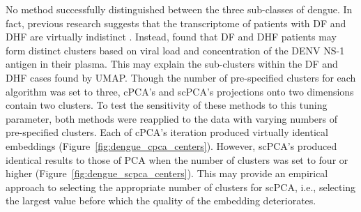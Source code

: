 No method successfully distinguished between the three sub-classes of dengue. In fact, previous research suggests that the transcriptome of patients with DF and DHF are virtually indistinct \citep{Kwissa2014}. Instead, \citet{Kwissa2014} found that DF and DHF patients may form distinct clusters based on viral load and concentration of the DENV NS-1 antigen in their plasma. This may explain the sub-clusters within the DF and DHF cases found by UMAP. Though the number of pre-specified clusters for each algorithm was set to three, cPCA's and scPCA's projections onto two dimensions contain two clusters. To test the sensitivity of these methods to this tuning parameter, both methods were reapplied to the data with varying numbers of pre-specified clusters. Each of cPCA's iteration produced virtually identical embeddings (Figure~\ref{fig:dengue_cpca_centers}). However, scPCA's produced identical results to those of PCA when the number of clusters was set to four or higher (Figure~\ref{fig:dengue_scpca_centers}). This may provide an empirical approach to selecting the appropriate number of clusters for scPCA, i.e., selecting the largest value before which the quality of the embedding deteriorates.

